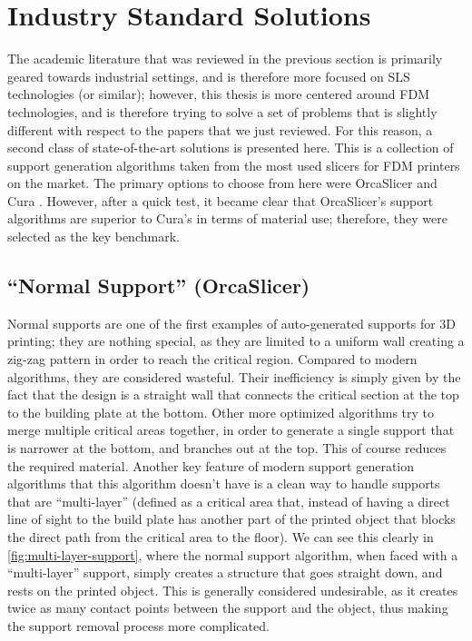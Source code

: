 \section{Industry Standard Solutions}


The academic literature that was reviewed in the previous section is primarily geared towards
industrial settings, and is therefore more focused on SLS technologies (or similar); however,
this thesis is more centered around FDM technologies, and is therefore trying to solve a set
of problems that is slightly different with respect to the papers that we just reviewed.
For this reason, a second class of state-of-the-art solutions is presented here.
This is a collection of support generation algorithms taken from the most used slicers for FDM printers
on the market.
The primary options to choose from here were OrcaSlicer \cite{orca_slicer} and Cura \cite{cura}.
However, after a quick test, it became clear that OrcaSlicer's support algorithms are superior
to Cura's in terms of material use; therefore, they were selected as the key benchmark.

\subsection{``Normal Support'' (OrcaSlicer)}
\label{sec:normal_supports}

Normal supports are one of the first examples of auto-generated supports for 3D printing;
they are nothing special, as they are limited to a uniform wall creating a zig-zag pattern in order
to reach the critical region.
Compared to modern algorithms, they are considered wasteful.
Their inefficiency is simply given by the fact that the design is a straight wall that connects the critical
section at the top to the building plate at the bottom. Other more optimized algorithms try to merge multiple
critical areas together, in order to generate a single support that is narrower at the bottom, and branches out at the
top. This of course reduces the required material.
Another key feature of modern support generation algorithms that this algorithm doesn't have is a clean way
to handle supports that are ``multi-layer'' (defined as a critical area that, instead of having a direct line of sight
to the build plate has another part of the printed object that blocks the direct path from the critical area to the floor).
We can see this clearly in \cref{fig:multi-layer-support},
where the normal support algorithm, when faced with a ``multi-layer'' support, simply creates a structure that goes
straight down, and rests on the printed object. This is generally considered undesirable, as it creates twice
as many contact points between the support and the object, thus making the support removal process more complicated.



